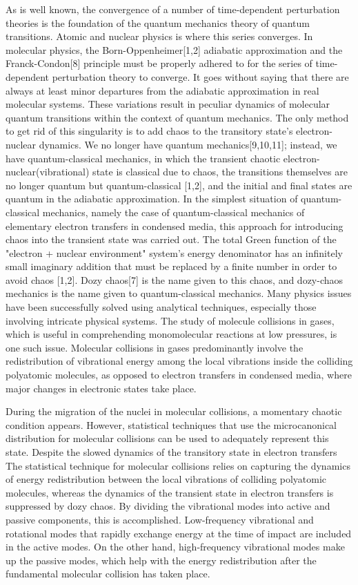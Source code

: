 \documentclass{article}
\begin{document}
As is well known, the convergence of a number of time-dependent perturbation theories is the foundation of the quantum mechanics theory of quantum transitions. Atomic and nuclear physics is where this series converges. In molecular physics, the Born-Oppenheimer[1,2] adiabatic approximation and the Franck-Condon[8] principle must be properly adhered to for the series of time-dependent perturbation theory to converge. It goes without saying that there are always at least minor departures from the adiabatic approximation in real molecular systems. These variations result in peculiar dynamics of molecular quantum transitions within the context of quantum mechanics. 
The only method to get rid of this singularity is to add chaos to the transitory state's electron-nuclear dynamics. We no longer have quantum mechanics[9,10,11]; instead, we have quantum-classical mechanics, in which the transient chaotic electron-nuclear(vibrational) state is classical due to chaos, the transitions themselves are no longer quantum but quantum-classical [1,2], and the initial and final states are quantum in the adiabatic approximation. In the simplest situation of quantum-classical mechanics, namely the case of quantum-classical mechanics of elementary electron transfers in condensed media, this approach for introducing chaos into the transient state was carried out. The total Green function of the "electron + nuclear environment" system's energy denominator has an infinitely small imaginary addition that must be replaced by a finite number in order to avoid chaos [1,2]. Dozy chaos[7] is the name given to this chaos, and dozy-chaos mechanics is the name given to quantum-classical mechanics. Many physics issues have been successfully solved using analytical techniques, especially those involving intricate physical systems. The study of molecule collisions in gases, which is useful in comprehending monomolecular reactions at low pressures, is one such issue. Molecular collisions in gases predominantly involve the redistribution of vibrational energy among the local vibrations inside the colliding polyatomic molecules, as opposed to electron transfers in condensed media, where major changes in electronic states take place.

During the migration of the nuclei in molecular collisions, a momentary chaotic condition appears. However, statistical techniques that use the microcanonical distribution for molecular collisions can be used to adequately represent this state. Despite the slowed dynamics of the transitory state in electron transfers The statistical technique for molecular collisions relies on capturing the dynamics of energy redistribution between the local vibrations of colliding polyatomic molecules, whereas the dynamics of the transient state in electron transfers is suppressed by dozy chaos. By dividing the vibrational modes into active and passive components, this is accomplished.
Low-frequency vibrational and rotational modes that rapidly exchange energy at the time of impact are included in the active modes. On the other hand, high-frequency vibrational modes make up the passive modes, which help with the energy redistribution after the fundamental molecular collision has taken place. 
\end{document}
